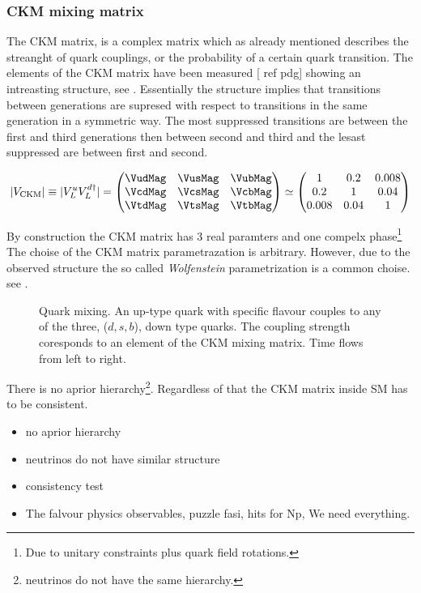 \subsubsection{CKM mixing matrix}
The CKM matrix, is a complex matrix which as already mentioned describes the streanght of quark couplings,
or the probability of a certain quark transition. The elements of the CKM matrix have been measured [{\color{red} ref pdg}]
showing an intreasting structure, see . Essentially the structure implies that transitions between generations
are supresed with respect to transitions in the same generation in a symmetric way. The most suppressed transitions are between
the first and third generations then between second and third and the lesast suppressed are between first and second.

\begin{equation}
  |V_{\text{CKM}}| \equiv |V^u_L V^{d\dagger}_L|
                   = \begin{pmatrix} \VudMag & \VusMag & \VubMag \\ \VcdMag & \VcsMag & \VcbMag \\ \VtdMag & \VtsMag & \VtbMag \end{pmatrix}
              \simeq \begin{pmatrix} 1 & 0.2 & 0.008 \\ 0.2 & 1 & 0.04 \\ 0.008 & 0.04 & 1 \end{pmatrix}
      \label{CKMmatrix}
  \end{equation}

By construction the CKM matrix has 3 real paramters and one compelx phase\footnote{Due to unitary constraints plus quark field rotations.}
The choise of the CKM matrix parametrazation is arbitrary. However, due to the observed structure the so called {\it Wolfenstein} parametrization
is a common choise. see \equref{}.

\begin{figure}[h]
  \centering
  {\sffamily }
  \caption{Quark mixing. An up-type quark with specific flavour couples to any of the three, ($d,s,b$), down type quarks.
           The coupling strength coresponds to an element of the CKM mixing matrix. Time flows from left to right.}
  \label{QuarkMixing}
\end{figure}


There is no aprior hierarchy\footnote{neutrinos do not have the same hierarchy.}.
Regardless of that the CKM matrix inside SM has to be consistent.

\begin{itemize}
  \item no aprior hierarchy
  \item neutrinos do not have similar structure
  \item consistency test
  \item The falvour physics observables, puzzle fasi, hits for Np, We need everything.
\end{itemize}

